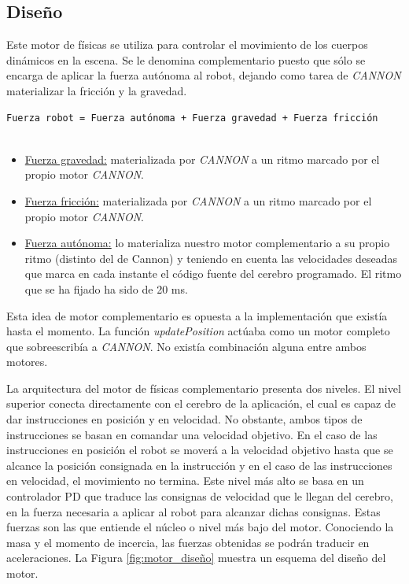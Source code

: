 \subsection{Diseño}
Este motor de físicas se utiliza para controlar el movimiento de los cuerpos dinámicos en la escena. Se le denomina complementario puesto que sólo se encarga de aplicar la fuerza autónoma al robot, dejando como tarea de \textit{CANNON} materializar la fricción y la gravedad.

\begin{verbatim}
Fuerza robot = Fuerza autónoma + Fuerza gravedad + Fuerza fricción


\end{verbatim}

\begin{itemize}
    \item \underline{Fuerza gravedad:} materializada por \textit{CANNON} a un ritmo marcado por el propio motor \textit{CANNON}.
    \item \underline{Fuerza fricción:} materializada por \textit{CANNON} a un ritmo marcado por el propio motor \textit{CANNON}.
    \item \underline{Fuerza autónoma:} lo materializa nuestro motor complementario a su propio ritmo (distinto del de Cannon) y teniendo en cuenta las velocidades deseadas que marca en cada instante el código fuente del cerebro programado. El ritmo que se ha fijado ha sido de 20 ms.
\end{itemize}

Esta idea de motor complementario es opuesta a la implementación que existía hasta el momento. La función \textit{updatePosition} actúaba como un motor completo que sobreescribía a \textit{CANNON}. No existía combinación alguna entre ambos motores. \newline


La arquitectura del motor de físicas complementario presenta dos niveles. El nivel superior conecta directamente con el cerebro de la aplicación, el cual es capaz de dar instrucciones en posición y en velocidad. No obstante, ambos tipos de instrucciones se basan en comandar una velocidad objetivo. En el caso de las instrucciones en posición el robot se moverá a la velocidad objetivo hasta que se alcance la posición consignada en la instrucción y en el caso de las instrucciones en velocidad, el movimiento no termina. Este nivel más alto se basa en un controlador PD que traduce las consignas de velocidad que le llegan del cerebro, en la fuerza necesaria a aplicar al robot para alcanzar dichas consignas. Estas fuerzas son las que entiende el núcleo o nivel más bajo del motor. Conociendo la masa y el momento de incercia, las fuerzas obtenidas se podrán traducir en aceleraciones. La Figura \ref{fig:motor_diseño} muestra un esquema del diseño del motor. \newline


